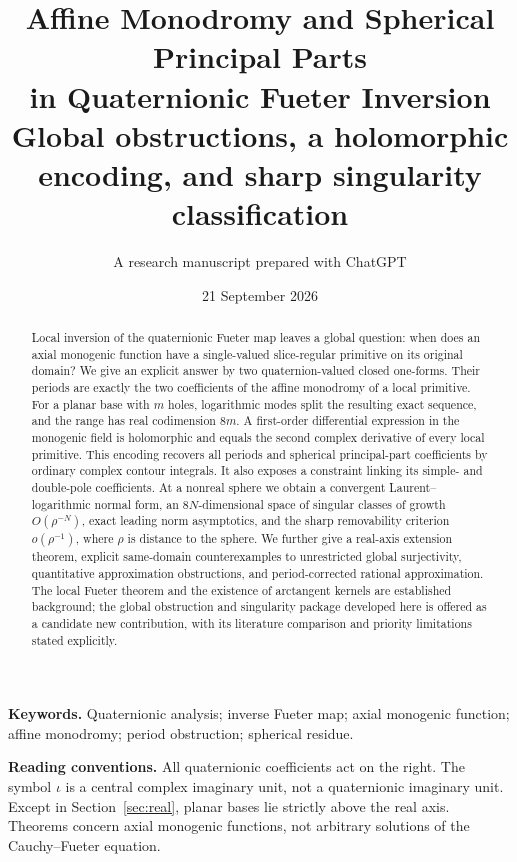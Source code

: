 \documentclass[11pt,a4paper]{article}
\title{\vspace{-10mm}\textbf{Affine Monodromy and Spherical Principal Parts\\in Quaternionic Fueter Inversion}\\[6pt]
\large Global obstructions, a holomorphic encoding, and sharp singularity classification}
\author{A research manuscript prepared with ChatGPT}
\date{21 September 2026}
\numberwithin{equation}{section}
\theoremstyle{definition}
\theoremstyle{remark}
\begin{document}
\maketitle
\thispagestyle{empty}
\begin{abstract}
Local inversion of the quaternionic Fueter map leaves a global question:
when does an axial monogenic function have a single-valued slice-regular
primitive on its original domain? We give an explicit answer by two
quaternion-valued closed one-forms. Their periods are exactly the two
coefficients of the affine monodromy of a local primitive. For a planar
base with $m$ holes, logarithmic modes split the resulting exact sequence,
and the range has real codimension $8m$. A first-order differential
expression in the monogenic field is holomorphic and equals the second
complex derivative of every local primitive. This encoding recovers all
periods and spherical principal-part coefficients by ordinary complex
contour integrals. It also exposes a constraint linking its simple- and
double-pole coefficients. At a nonreal sphere we obtain a convergent
Laurent--logarithmic normal form, an $8N$-dimensional space of singular
classes of growth $O(\rho^{-N})$, exact leading norm asymptotics, and the
sharp removability criterion $o(\rho^{-1})$, where $\rho$ is distance to
the sphere. We further give a real-axis extension theorem, explicit
same-domain counterexamples to unrestricted global surjectivity,
quantitative approximation obstructions, and period-corrected rational
approximation. The local Fueter theorem and the existence of arctangent
kernels are established background; the global obstruction and singularity
package developed here is offered as a candidate new contribution, with
its literature comparison and priority limitations stated explicitly.
\end{abstract}
\noindent\textbf{Keywords.} Quaternionic analysis; inverse Fueter map; axial
monogenic function; affine monodromy; period obstruction; spherical residue.

\medskip
\noindent\textbf{Reading conventions.} All quaternionic coefficients act
on the right. The symbol $\iota$ is a central complex imaginary unit,
not a quaternionic imaginary unit. Except in Section~\ref{sec:real}, planar
bases lie strictly above the real axis. Theorems concern axial monogenic
functions, not arbitrary solutions of the Cauchy--Fueter equation.
\newpage
\begingroup
\small
\setlength{\parskip}{0pt}
\makeatletter
\patchcmd{\l@section}{1.0em}{0.45em}{}{}
\makeatother
\tableofcontents
\endgroup
\newpage
\end{document}
